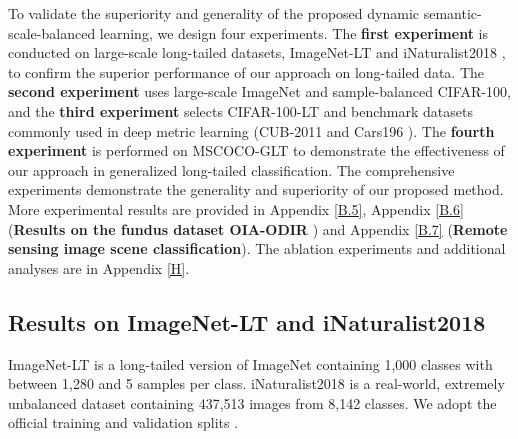 \documentclass[10pt]{article} %
\begin{document}
To validate the superiority and generality of the proposed dynamic semantic-scale-balanced learning, we design four experiments. The \textbf{first experiment} is conducted on large-scale long-tailed datasets, ImageNet-LT and iNaturalist2018 \cite {paper67}, to confirm the superior performance of our approach on long-tailed data. The \textbf{second experiment} uses large-scale ImageNet \cite {paper66} and sample-balanced CIFAR-100, and the \textbf{third experiment} selects CIFAR-100-LT and benchmark datasets commonly used in deep metric learning (CUB-2011 \cite {paper29} and Cars196 \cite {paper30}). The \textbf{fourth experiment} is performed on MSCOCO-GLT \cite{paper115} to demonstrate the effectiveness of our approach in generalized long-tailed classification. The comprehensive experiments demonstrate the generality and superiority of our proposed method. More experimental results are provided in Appendix \ref{B.5}, Appendix \ref{B.6} (\textbf{Results on the fundus dataset OIA-ODIR} \cite {paper109}) and Appendix \ref{B.7} (\textbf{Remote sensing image scene classification}). The ablation experiments and additional analyses are in Appendix \ref{H}.



\subsection{Results on ImageNet-LT and iNaturalist2018 \label{5.1}}

ImageNet-LT is a long-tailed version of ImageNet containing 1,000 classes with between 1,280 and 5 samples per class. iNaturalist2018 is a real-world, extremely unbalanced dataset containing 437,513 images from 8,142 classes. We adopt the official training and validation splits \cite{paper14}.
\end{document}
